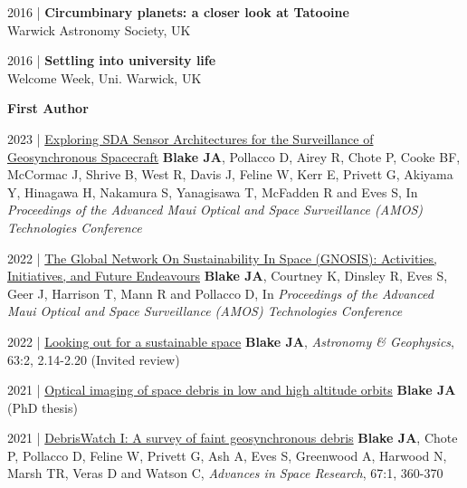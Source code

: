 \documentclass[10pt,a4paper]{altacv}
\begin{document}
\smallskip

\small 2016 | \textbf{Circumbinary planets: a closer look at Tatooine} \\
Warwick Astronomy Society, UK

\smallskip

\small 2016 | \textbf{Settling into university life} \\
Welcome Week, Uni. Warwick, UK

\medskip


\normalsize \textbf{First Author} 

\medskip

\small
2023 | \href{https://www.researchgate.net/publication/374144515_Exploring_SDA_Sensor_Architectures_for_the_Surveillance_of_Geosynchronous_Spacecraft}{Exploring SDA Sensor Architectures for the Surveillance of Geosynchronous Spacecraft}
\textbf{Blake JA}, Pollacco D, Airey R, Chote P, Cooke BF, McCormac J, Shrive B, West R, Davis J, Feline W, Kerr E, Privett G, Akiyama Y, Hinagawa H, Nakamura S, Yanagisawa T, McFadden R and Eves S, In \textit{Proceedings of the Advanced Maui Optical and Space Surveillance (AMOS) Technologies Conference}

\smallskip

\small
2022 | \href{https://www.researchgate.net/publication/363157906_The_Global_Network_On_Sustainability_In_Space_GNOSIS_Activities_Initiatives_and_Future_Endeavours}{The Global Network On Sustainability In Space (GNOSIS): Activities, Initiatives, and Future Endeavours}
\textbf{Blake JA}, Courtney K, Dinsley R, Eves S, Geer J, Harrison T, Mann R and Pollacco D, In \textit{Proceedings of the Advanced Maui Optical and Space Surveillance (AMOS) Technologies Conference}

\smallskip

\small
2022 | \href{https://academic.oup.com/astrogeo/article/63/2/2.14/6546993}{Looking out for a sustainable space}
\textbf{Blake JA}, \textit{Astronomy \& Geophysics}, 63:2, 2.14-2.20 (Invited review)

\smallskip

\small
2021 | \href{https://www.researchgate.net/publication/355472603_Optical_imaging_of_space_debris_in_low_and_high_altitude_orbits}{Optical imaging of space debris in low and high altitude orbits}
\textbf{Blake JA} (PhD thesis)

\smallskip

\small
2021 | \href{https://www.sciencedirect.com/science/article/abs/pii/S0273117720305664}{DebrisWatch I: A survey of faint geosynchronous debris}
\textbf{Blake JA}, Chote P, Pollacco D, Feline W, Privett G, Ash A, Eves S, Greenwood A, Harwood N, Marsh TR, Veras D and Watson C, \textit{Advances in Space Research}, 67:1, 360-370
\end{document}
